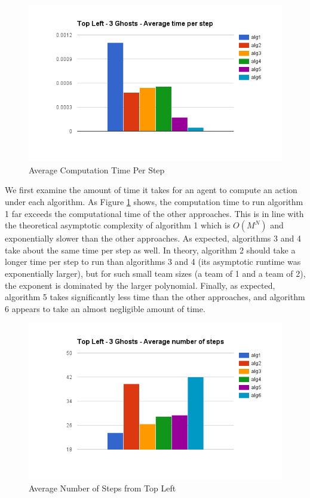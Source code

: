 \documentclass[11pt]{article}
\begin{document}
\begin{multicols}{2}
\begin{figure}[H]
	\includegraphics[scale=0.45]{time.png}
	\caption{Average Computation Time Per Step}
	\label{fig:averagecomputation}
\end{figure}
We first examine the amount of time it takes for an agent to compute an action under each algorithm. As Figure \ref{fig:averagecomputation} shows, the computation time to run algorithm 1 far exceeds the computational time of the other approaches. This is in line with the theoretical asymptotic complexity of algorithm 1 which is $O(M^N)$ and exponentially slower than the other approaches. As expected, algorithms 3 and 4 take about the same time per step as well. In theory, algorithm 2 should take a longer time per step to run than algorithms 3 and 4 (its asymptotic runtime was exponentially larger), but for such small team sizes (a team of 1 and a team of 2), the exponent is dominated by the larger polynomial. Finally, as expected, algorithm 5 takes significantly less time than the other approaches, and algorithm 6 appears to take an almost negligible amount of time. 
	
\begin{figure}[H]
	\includegraphics[scale=0.45]{leftsteps.png}
	\caption{Average Number of Steps from Top Left}
	\label{fig:averagenumstepsleft}
\end{figure}






\end{multicols}
\end{document}

